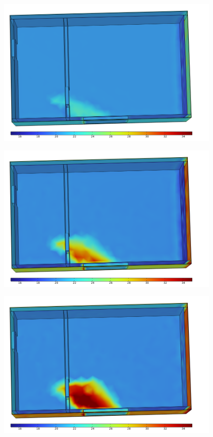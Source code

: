 \documentclass[14pt,aspectratio=169,hyperref={pdftex,unicode},xcolor=dvipsnames]{beamer}
\begin{document}
\begin{frame} \begin{center}
\includegraphics[width=11cm]{images/solar_radiation/solar_1.png}
\end{center} \end{frame}
\begin{frame} \begin{center}
\includegraphics[width=11cm]{images/solar_radiation/solar_2.png}
\end{center} \end{frame}
\begin{frame} \begin{center}
\includegraphics[width=11cm]{images/solar_radiation/solar_3.png}
\end{center} \end{frame}
\end{document}
